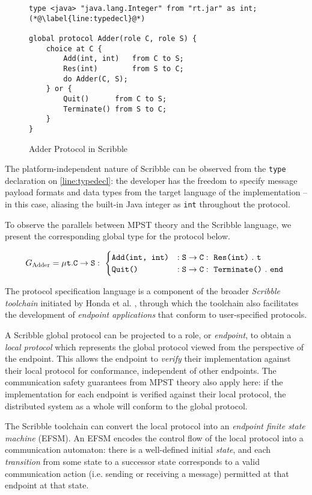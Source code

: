 \begin{figure}[!ht]
\begin{lstlisting}[language=Scribble]
type <java> "java.lang.Integer" from "rt.jar" as int; (*@\label{line:typedecl}@*)

global protocol Adder(role C, role S) {
	choice at C {
		Add(int, int)	from C to S;
		Res(int)		from S to C;
		do Adder(C, S);
	} or {
		Quit()		from C to S;
		Terminate()	from S to C;	
	}
}
\end{lstlisting}
\caption{Adder Protocol in Scribble}
\label{fig:adder}
\end{figure}

The platform-independent nature of Scribble 
can be observed from the \texttt{type} declaration 
on \cref{line:typedecl}: 
the developer has the freedom to specify message payload formats 
and data types from the target language of the implementation 
-- in this case, aliasing the built-in Java integer as 
\texttt{int} throughout the protocol.

To observe the parallels between MPST theory
and the Scribble language,
we present the corresponding global type for
the  protocol below.

\[
G_\text{Adder} = \mu\textnormal{\texttt{t}}.{
{\mathtt{C}} \to {\mathtt{S}}: ~ {
	\begin{cases}
		\texttt{Add(int, int)} & :
			{\mathtt{S}} \to {\mathtt{C}}: ~ {\texttt{Res(int)}} ~. ~\textnormal{\texttt{t}} \\
		\texttt{Quit()} & : 
			{\mathtt{S}} \to {\mathtt{C}}: ~ {\texttt{Terminate()}} ~.~ \textnormal{\texttt{end}} \\		
	\end{cases}
} ~} 
\]

The protocol specification language is 
a component of the broader 
\textit{Scribble toolchain} initiated by 
Honda et al. \cite{Scribble}, 
through which the toolchain also facilitates 
the development of 
\textit{endpoint applications} that 
conform to user-specified protocols.

A Scribble global protocol can be projected
to a role, or \textit{endpoint},
to obtain a \textit{local protocol} 
which represents
the global protocol viewed from the perspective
of the endpoint.
This allows the endpoint to \textit{verify} their
implementation against their local protocol
for conformance, independent of other endpoints.
The communication safety guarantees from MPST
theory also apply here: if the implementation
for each endpoint is verified against their
local protocol, the distributed system as
a whole will conform to the global protocol.

The Scribble toolchain can convert the local
protocol into an \textit{endpoint finite state machine}
(EFSM).
An EFSM encodes the control flow of the local
protocol into a communication automaton:
there is a well-defined initial \textit{state},
and each \textit{transition} from some state to a
successor state corresponds to a valid communication
action (i.e. sending or receiving a message) permitted
at that endpoint at that state.

